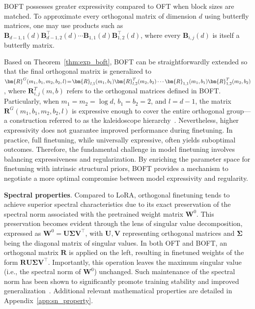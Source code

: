 \begin{theorem}\label{thm:exp_boft}
    BOFT possesses greater expressivity compared to OFT when block sizes are matched. To approximate every orthogonal matrix of dimension $d$ using butterfly matrices, one may use products such as $\bm{B}_{d-1,1}(d)\bm{B}^\top_{d-1,2}(d)\cdots\bm{B}_{1,1}(d)\bm{B}^\top_{1,2}(d)$, where every $\bm{B}_{i,j}(d)$ is itself a butterfly matrix.
\end{theorem}

Based on Theorem~\ref{thm:exp_boft}, BOFT can be straightforwardly extended so that the final orthogonal matrix is generalized to $\thickmuskip=2mu \medmuskip=2mu \bm{R}^G(m_1,b_1,m_2,b_2,l)=\bm{R}_{l,1}(m_1,b_1)\bm{R}_{l,2}^T(m_2,b_2)\cdots\bm{R}_{1,1}(m_1,b_1)\bm{R}_{1,2}^T(m_2,b_2)$, where $\bm{R}_{i,j}^T(m,b)$ refers to the orthogonal matrices defined in BOFT. Particularly, when $m_1=m_2=\log d$, $b_1=b_2=2$, and $l=d-1$, the matrix $\bm{R}^G(m_1,b_1,m_2,b_2,l)$ is expressive enough to cover the entire orthogonal group—a construction referred to as the kaleidoscope hierarchy~\cite{dao2019kaleidoscope}. Nevertheless, higher expressivity does not guarantee improved performance during finetuning. In practice, full finetuning, while universally expressive, often yields suboptimal outcomes. Therefore, the fundamental challenge in model finetuning involves balancing expressiveness and regularization. By enriching the parameter space for finetuning with intrinsic structural priors, BOFT provides a mechanism to negotiate a more optimal compromise between model expressivity and regularity.

\textbf{Spectral properties}. Compared to LoRA, orthogonal finetuning tends to achieve superior spectral characteristics due to its exact preservation of the spectral norm associated with the pretrained weight matrix $\bm{W}^0$. This preservation becomes evident through the lens of singular value decomposition, expressed as $\bm{W}^0 = \bm{U}\bm{\Sigma}\bm{V}^\top$, with $\bm{U},\bm{V}$ representing orthogonal matrices and $\bm{\Sigma}$ being the diagonal matrix of singular values. In both OFT and BOFT, an orthogonal matrix $\bm{R}$ is applied on the left, resulting in finetuned weights of the form $\bm{R}\bm{U}\bm{\Sigma}\bm{V}^\top$. Importantly, this operation leaves the maximum singular value (i.e., the spectral norm of $\bm{W}^0$) unchanged. Such maintenance of the spectral norm has been shown to significantly promote training stability and improved generalization~\cite{miyato2018spectral, yoshida2017spectral}. Additional relevant mathematical properties are detailed in Appendix~\ref{app:sn_property}.

